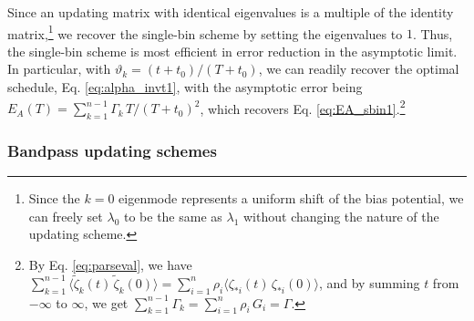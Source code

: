 \documentclass[preprint, superscriptaddress, floatfix]{revtex4-1}
\newcommand{\Err}{E}
\begin{document}
Since an updating matrix
with identical eigenvalues
is a multiple of the identity matrix,\footnote{Since
  the $k = 0$ eigenmode represents
  a uniform shift of the bias potential,
  we can freely set $\lambda_0$ to be
  the same as $\lambda_1$
  without changing the nature of
  the updating scheme.}
we recover the single-bin scheme
by setting the eigenvalues to $1$.
%
Thus, the single-bin scheme is most efficient
in error reduction in the asymptotic limit.
%
In particular,
with $\vartheta_k = (t+t_0)/(T+t_0)$,
we can readily recover the optimal schedule,
Eq. \eqref{eq:alpha_invt1}, with
the asymptotic error being
$\Err_A(T) = \sum_{ k = 1 }^{n-1} \Gamma_k \, T / (T + t_0)^2$,
%
%
which recovers Eq. \eqref{eq:EA_sbin1}.\footnote{By
Eq. \eqref{eq:parseval}, we have
$\sum_{k=1}^{n-1} \bigl\langle {\tilde \zeta}_k(t) \, {\tilde \zeta}_k(0) \bigr\rangle
= \sum_{i=1}^n \rho_i \bigl\langle \zeta_{*i}(t) \, \zeta_{*i}(0) \bigr\rangle$,
and by summing $t$ from $-\infty$ to $\infty$, we get
$\sum_{k=1}^{n-1} \Gamma_k = \sum_{i=1}^n \rho_i \, G_i = \Gamma$.}




\subsubsection{\label{sec:bandpass}
Bandpass updating schemes}
\end{document}
